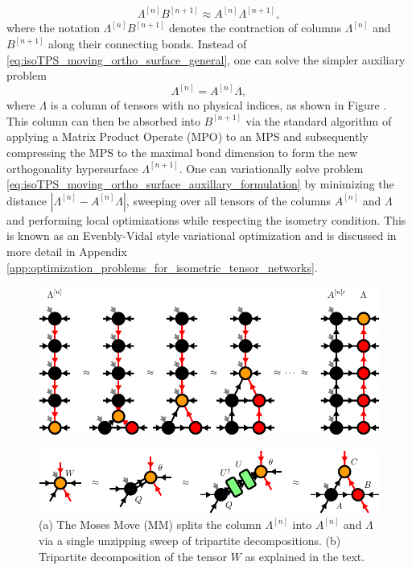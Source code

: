 \begin{equation}
	\label{eq:isoTPS_moving_ortho_surface_general}
	\Lambda^{[n]} B^{[n+1]} \approx A^{[n]} \Lambda^{[n+1]},
\end{equation}
where the notation $\Lambda^{[n]} B^{[n+1]}$ denotes the contraction of columns $\Lambda^{[n]}$ and $B^{[n+1]}$ along their connecting bonds. Instead of \eqref{eq:isoTPS_moving_ortho_surface_general}, one can solve the simpler auxiliary problem
\begin{equation}
	\label{eq:isoTPS_moving_ortho_surface_auxillary_formulation}
	\Lambda^{[n]} = A^{[n]} \Lambda,
\end{equation}
where $\Lambda$ is a column of tensors with no physical indices, as shown in Figure . This column can then be absorbed into $B^{[n+1]}$ via the standard algorithm of applying a Matrix Product Operate (MPO) to an MPS and subsequently compressing the MPS to the maximal bond dimension \cite{cite:DMRG_in_the_age_of_MPS} to form the new orthogonality hypersurface $\Lambda^{[n+1]}$. One can variationally solve problem \eqref{eq:isoTPS_moving_ortho_surface_auxillary_formulation} by minimizing the distance $\left\lvert\Lambda^{[n]}-A^{[n]}\Lambda\right\rvert$, sweeping over all tensors of the columns $A^{[n]}$ and $\Lambda$ and performing local optimizations while respecting the isometry condition. This is known as an Evenbly-Vidal style variational optimization and is discussed in more detail in Appendix \ref{app:optimization_problems_for_isometric_tensor_networks}.
\begin{figure}
	\centering
	\subcaptionbox{\label{fig:Moses_move}}
	{%
		\includegraphics[scale=1]{figures/tikz/Tensor_Networks/isoTPS_MM/isoTPS_MM_a.pdf}
	}
	\par\medskip
	\subcaptionbox{\label{fig:tripartite_decomposition}}
	{%
		\includegraphics[scale=1]{figures/tikz/Tensor_Networks/isoTPS_MM/isoTPS_MM_b.pdf}
		
	}
	\caption{(a) The Moses Move (MM) splits the column $\Lambda^{[n]}$ into $A^{[n]}$ and $\Lambda$ via a single unzipping sweep of tripartite decompositions. (b) Tripartite decomposition of the tensor $W$ as explained in the text.}
	\label{fig:Moses_move_and_tripartite_decomposition}
\end{figure}
